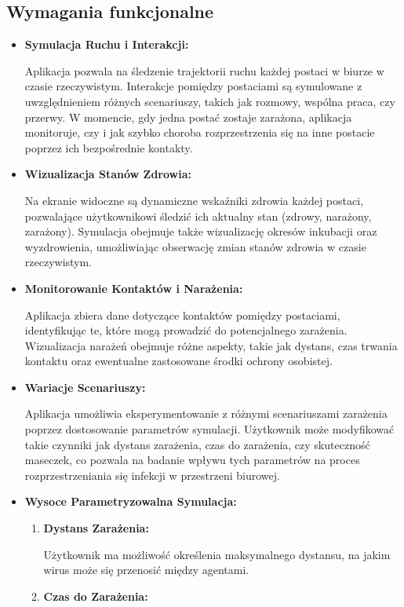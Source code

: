 \subsection{\textbf{Wymagania funkcjonalne}}
\begin{itemize}
	\item \textbf{ Symulacja Ruchu i Interakcji:}
	
	Aplikacja pozwala na śledzenie trajektorii ruchu każdej postaci w biurze w czasie rzeczywistym.
	Interakcje pomiędzy postaciami są symulowane z uwzględnieniem różnych scenariuszy, takich jak rozmowy, wspólna praca, czy przerwy.
	W momencie, gdy jedna postać zostaje zarażona, aplikacja monitoruje, czy i jak szybko choroba rozprzestrzenia się na inne postacie poprzez ich bezpośrednie kontakty.
	\item \textbf{Wizualizacja Stanów Zdrowia:}
	
	Na ekranie widoczne są dynamiczne wskaźniki zdrowia każdej postaci, pozwalające użytkownikowi śledzić ich aktualny stan (zdrowy, narażony, zarażony).
	Symulacja obejmuje także wizualizację okresów inkubacji oraz wyzdrowienia, umożliwiając obserwację zmian stanów zdrowia w czasie rzeczywistym.
	\item \textbf{Monitorowanie Kontaktów i Narażenia:}
	
	Aplikacja zbiera dane dotyczące kontaktów pomiędzy postaciami, identyfikując te, które mogą prowadzić do potencjalnego zarażenia.
	Wizualizacja narażeń obejmuje różne aspekty, takie jak dystans, czas trwania kontaktu oraz ewentualne zastosowane środki ochrony osobistej.
	\item \textbf{Wariacje Scenariuszy:}
	
	Aplikacja umożliwia eksperymentowanie z różnymi scenariuszami zarażenia poprzez dostosowanie parametrów symulacji. Użytkownik może modyfikować takie czynniki jak dystans zarażenia, czas do zarażenia, czy skuteczność maseczek, co pozwala na badanie wpływu tych parametrów na proces rozprzestrzeniania się infekcji w przestrzeni biurowej.

	\item \textbf{Wysoce Parametryzowalna Symulacja:}
	\begin{enumerate}
		\item \textbf{Dystans Zarażenia:}
		
		Użytkownik ma możliwość określenia maksymalnego dystansu, na jakim wirus może się przenosić między agentami.
		\item \textbf{Czas do Zarażenia:}
		

\end{enumerate}
\end{itemize}
